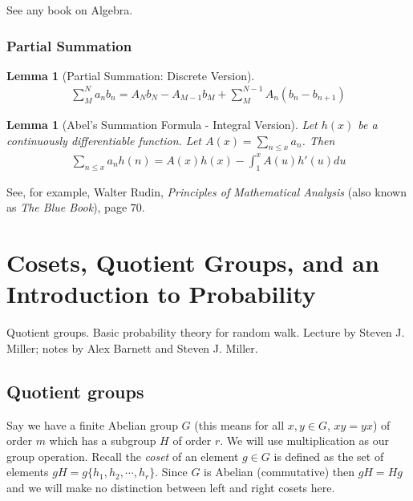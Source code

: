 \documentclass[12pt,letterpaper]{report}
\newtheorem{lem}[thm]{Lemma}
\begin{document}
See any book on Algebra.

\subsection{Partial Summation}

\begin{lem}[Partial Summation: Discrete
Version]\label{lempartialsummationdiscretefirst}
\begin{eqnarray}
\sum_M^N a_n b_n = A_N b_N - A_{M-1} b_M + \sum_M^{N-1} A_n (b_n -
b_{n+1})
\end{eqnarray}
\end{lem}

\begin{lem}[Abel's Summation Formula - Integral
Version]\label{partialsummationintegralfirst} Let $h(x)$ be a
continuously differentiable function. Let $A(x) = \sum_{n \leq x}
a_n$. Then
\begin{eqnarray}
\sum_{n \leq x} a_n h(n) = A(x) h(x) - \int_1^x A(u) h'(u) du
\end{eqnarray}
\end{lem}

See, for example, Walter Rudin, \emph{Principles of Mathematical
Analysis} (also known as \emph{The Blue Book}), page $70$.





\chapter{Cosets, Quotient Groups, and an Introduction to Probability}

Quotient groups. Basic probability theory for random walk. Lecture
by Steven J. Miller; notes by Alex Barnett and Steven J. Miller.

\section{Quotient groups}

Say we have a finite Abelian group $G$ (this means for all $x, y
\in G$, $xy = yx$) of order $m$ which has a subgroup $H$ of order
$r$. We will use multiplication as our group operation. Recall the
{\em coset} of an element $g\in G$ is defined as the set of
elements $gH = g\{h_1,h_2,\cdots,h_r\}$. Since $G$ is Abelian
(commutative) then $gH = Hg$ and we will make no distinction
between left and right cosets here.
\end{document}
